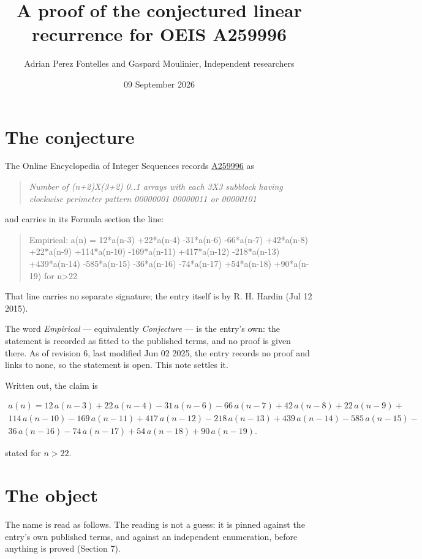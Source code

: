 \documentclass[11pt]{article}
\title{A proof of the conjectured linear recurrence for OEIS A259996}
\author{Adrian Perez Fontelles and Gaspard Moulinier, Independent researchers}
\date{09 September 2026}
\theoremstyle{definition}
\begin{document}
\maketitle
\section{The conjecture}

The Online Encyclopedia of Integer Sequences records \href{https://oeis.org/A259996}{A259996} as

\begin{quote}\itshape Number of (n+2)X(3+2) 0..1 arrays with each 3X3 subblock having clockwise perimeter pattern 00000001 00000011 or 00000101\end{quote}

and carries in its Formula section the line:

\begin{quote}\ttfamily Empirical: a(n) = 12*a(n-3) +22*a(n-4) -31*a(n-6) -66*a(n-7) +42*a(n-8) +22*a(n-9) +114*a(n-10) -169*a(n-11) +417*a(n-12) -218*a(n-13) +439*a(n-14) -585*a(n-15) -36*a(n-16) -74*a(n-17) +54*a(n-18) +90*a(n-19) for n>22\end{quote}

That line carries no separate signature; the entry itself is by R. H. Hardin (Jul 12 2015).

The word {\itshape Empirical} --- equivalently {\itshape Conjecture} --- is the entry's own: the statement is recorded as fitted to the published terms, and no proof is given there. As of revision 6, last modified Jun 02 2025, the entry records no proof and links to none, so the statement is open. This note settles it.

Written out, the claim is

\begin{multline*} a(n) = 12\,a(n-3) + 22\,a(n-4) - 31\,a(n-6) - 66\,a(n-7) + 42\,a(n-8) + 22\,a(n-9) + \\ 114\,a(n-10) - 169\,a(n-11) + 417\,a(n-12) - 218\,a(n-13) + 439\,a(n-14) - 585\,a(n-15) - \\ 36\,a(n-16) - 74\,a(n-17) + 54\,a(n-18) + 90\,a(n-19). \end{multline*}

stated for $n > 22$.

\section{The object}

The name is read as follows. The reading is not a guess: it is pinned against the entry's own published terms, and against an independent enumeration, before anything is proved (Section 7).
\end{document}

